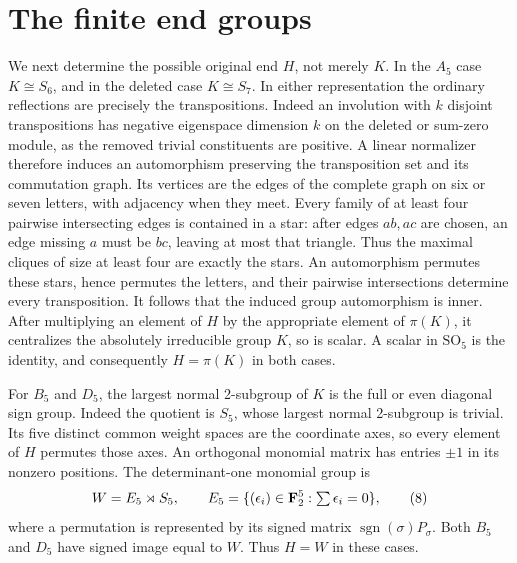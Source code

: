 \documentclass[11pt,a4paper]{article}
\begin{document}
\section{The finite end groups}
We next determine the possible original end $H$, not merely $K$.
In the $A_5$ case $K\cong S_6$, and in the deleted case
$K\cong S_7$. In either representation the ordinary reflections are
precisely the transpositions. Indeed an involution with $k$ disjoint
transpositions has negative eigenspace dimension $k$ on the deleted
or sum-zero module, as the removed trivial constituents are positive.
A linear normalizer therefore induces an automorphism preserving the
transposition set and its commutation graph. Its vertices are the edges
of the complete graph on six or seven letters, with adjacency when
they meet. Every family of at least four pairwise intersecting edges
is contained in a star: after edges $ab,ac$ are chosen, an edge missing
$a$ must be $bc$, leaving at most that triangle. Thus the maximal
cliques of size at least four are exactly the stars. An automorphism
permutes these stars, hence permutes the letters, and their pairwise
intersections determine every transposition. It follows that the
induced group automorphism is inner. After multiplying an element of
$H$ by the appropriate element of $\pi(K)$, it centralizes the
absolutely irreducible group $K$, so is scalar. A scalar in
$\mathrm{SO}_5$ is the identity, and consequently $H=\pi(K)$
in both cases.

For $B_5$ and $D_5$, the largest normal 2-subgroup of $K$ is the
full or even diagonal sign group. Indeed the quotient is $S_5$,
whose largest normal 2-subgroup is trivial. Its five distinct common
weight spaces are the coordinate axes, so every element of $H$
permutes those axes. An orthogonal monomial matrix has entries $\pm1$
in its nonzero positions. The determinant-one monomial group is
\[
              W=E_5\rtimes S_5,\qquad
 E_5=\{(\epsilon_i)\in\mathbf F_2^5:\textstyle\sum\epsilon_i=0\},
                                                               \tag{8}
\]
where a permutation is represented by its signed matrix
$\operatorname{sgn}(\sigma)P_\sigma$. Both $B_5$ and $D_5$ have
signed image equal to $W$. Thus $H=W$ in these cases.
\end{document}
